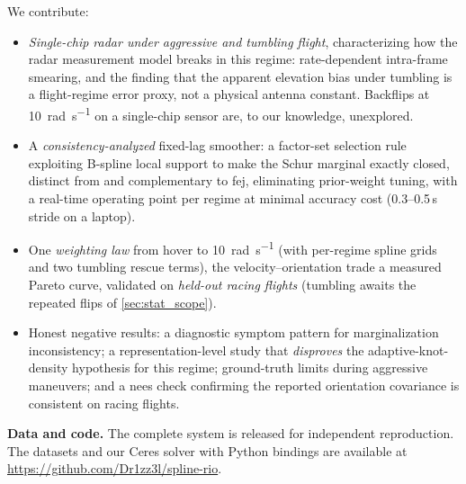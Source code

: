 We contribute:
\begin{itemize}
  \item \emph{Single-chip radar under aggressive and tumbling flight},
        characterizing how the radar measurement model breaks in this
        regime: rate-dependent intra-frame smearing, and the finding
        that the apparent elevation bias under tumbling is a
        flight-regime error proxy, not a physical antenna constant.
        Backflips at \SI{10}{\radian\per\second} on a single-chip
        sensor are, to our knowledge, unexplored.
  \item A \emph{consistency-analyzed} fixed-lag smoother: a factor-set
        selection rule exploiting B-spline local support to make the
        Schur marginal exactly closed, distinct from and
        complementary to \ac{fej}, eliminating prior-weight tuning, with a
        real-time operating point per regime at minimal accuracy cost
        (0.3--0.5\,s stride on a laptop).
  \item One \emph{weighting law} from hover to
        \SI{10}{\radian\per\second} (with per-regime spline grids and two
        tumbling rescue terms), the velocity--orientation trade a measured
        Pareto curve, validated on \emph{held-out racing flights}
        (tumbling awaits the repeated flips of \autoref{sec:stat_scope}).
  \item Honest negative results: a diagnostic symptom pattern for
        marginalization inconsistency; a representation-level study
        that \emph{disproves} the adaptive-knot-density hypothesis for
        this regime; ground-truth limits during aggressive maneuvers;
        and a \ac{nees} check confirming the reported orientation covariance
        is consistent on racing flights.
\end{itemize}

\textbf{Data and code.}
The complete system is released for independent reproduction.  The datasets
and our Ceres solver with Python bindings are available at
\url{https://github.com/Dr1zz3l/spline-rio}.

